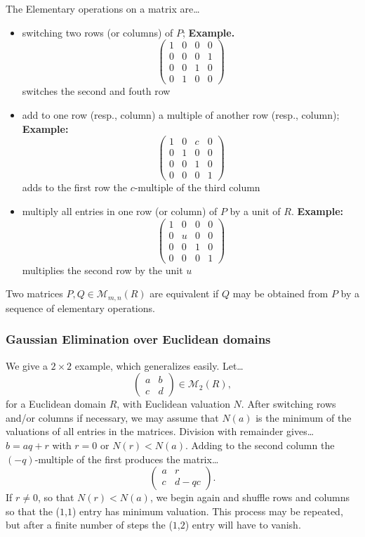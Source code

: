 \noindent The Elementary operations on a matrix are\dots
\begin{itemize}
  \item switching two rows (or columns) of $P$;
  \textbf{Example.} \[
  	\begin{pmatrix}
		1 & 0 & 0 & 0 \\
		0 & 0 & 0 & 1 \\
		0 & 0 & 1 & 0 \\
		0 & 1 & 0 & 0
	\end{pmatrix}
  \] switches the second and fouth row
  \item add to one row (resp., column) a multiple of another row (resp., column);
  \textbf{Example:} \[
  	\begin{pmatrix}
		1 & 0 & c & 0 \\
		0 & 1 & 0 & 0 \\
		0 & 0 & 1 & 0 \\
		0 & 0 & 0 & 1
	\end{pmatrix}
  \] adds to the first row the $c$-multiple of the third column
  \item multiply all entries in one row (or column) of $P$ by a unit of $R$.
  \textbf{Example:} \[
  	\begin{pmatrix}
		1 & 0 & 0 & 0 \\
		0 & u & 0 & 0 \\
		0 & 0 & 1 & 0 \\
		0 & 0 & 0 & 1
	\end{pmatrix}
  \] multiplies the second row by the unit $u$
\end{itemize}

\begin{proposition}
Two matrices $P,Q \in \mathcal{M}_{m,n}(R)$ are equivalent if $Q$ may be obtained from $P$ by a sequence of elementary operations.
\end{proposition}

\subsubsection{Gaussian Elimination over Euclidean domains}\label{gaussianelimination}
We give a $2 \times 2$ example, which generalizes easily. Let\dots
\[
\begin{pmatrix}
	a & b\\
	c & d
\end{pmatrix}
\in \mathcal{M}_2(R),
\]
for a Euclidean domain $R$, with Euclidean valuation $N$. After switching rows and/or columns if necessary, we may assume that $N(a)$ is
the minimum of the valuations of all entries in the matrices. Division with remainder gives\dots
$b = aq + r$
with $r = 0$ or $N(r) < N(a)$. Adding to the second column the $(-q)$-multiple of the first produces the matrix\dots
\[
\begin{pmatrix}
	a & r\\
	c & d - qc
\end{pmatrix}.
\]
If $r \neq 0$, so that $N(r) < N(a)$, we begin again and shuffle rows and columns so that the ($1$,$1$) entry has minimum valuation. This
process may be repeated, but after a finite number of steps the ($1$,$2$) entry will have to vanish.

